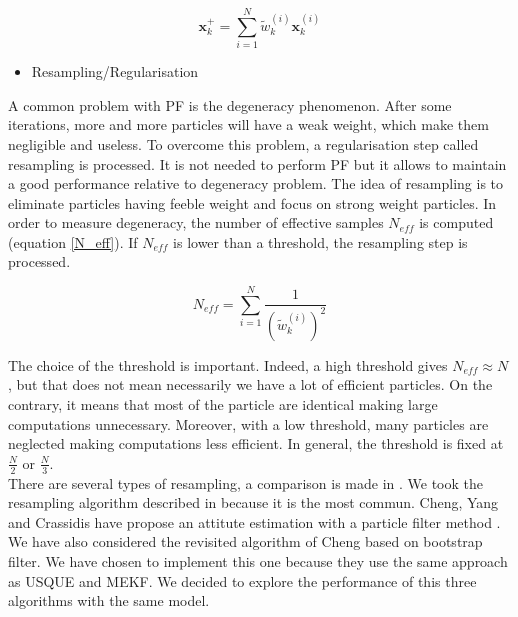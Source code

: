 \documentclass[twocolumn]{bmcart}
\begin{document}
\begin{equation}
 \textbf{x}_k^+ = \sum_{i=1}^N\tilde{w}_k^{(i)} \textbf{x}_k^{(i)}
 \end{equation}



\begin{itemize}
\item Resampling/Regularisation
\end{itemize}

A common problem with PF is the degeneracy phenomenon. After some iterations, more and more particles will have a weak weight, which make them negligible and useless.  To overcome this problem, a regularisation step called resampling is processed. It is not needed to perform PF but it allows to maintain a good performance relative to degeneracy problem. The idea of resampling is to eliminate particles having feeble weight and focus on strong weight particles. In order to measure degeneracy, the number of effective samples $N_{eff}$ is computed (equation \ref{N_eff}). If  $N_{eff}$ is lower than a threshold, the resampling step is processed.

\begin{equation}
 N_{eff} = \sum_{i=1}^N\frac{1}{(\tilde{w}_k^{(i)})^2}
 \label{N_eff}
 \end{equation}


The choice of the threshold is important. Indeed, a high threshold gives $N_{eff} \approx N$, but that does not mean necessarily we have a lot of efficient particles. On the contrary, it means that most of the particle are identical making large computations unnecessary. Moreover, with a low threshold, many particles are neglected making computations less efficient. In general, the threshold is fixed at  $\frac{N}{2}$ or $\frac{N}{3}$.\\

There are several types of resampling, a comparison is made in \cite{douc2005comparison}. We took the resampling algorithm described in \cite{arulampalam2002tutorial} because it is the most commun. Cheng, Yang and Crassidis have propose an attitute estimation with a particle filter method \cite{cheng_particle_2010}. We have also considered the revisited algorithm of Cheng \cite{chang_particle_2014} based on bootstrap filter\cite{gordon1993novel}. We have chosen to implement this one because they use the same approach as USQUE \cite{crassidis_unscented_2003} and MEKF\cite{markley2003attitude}. We decided to explore the performance of this three algorithms with the same model. \\
\end{document}
